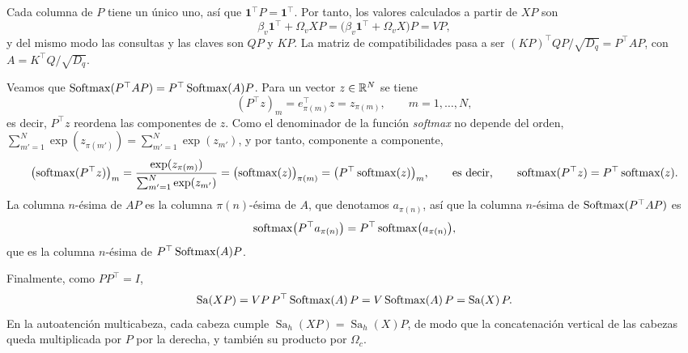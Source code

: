 \begin{demostracion}
Cada columna de $P$ tiene un único uno, así que $\mathbf{1}^{\top}P = \mathbf{1}^{\top}$.
Por tanto, los valores calculados a partir de $XP$ son
\[
  \beta_v\mathbf{1}^{\top} + \Omega_v XP = \bigl(\beta_v\mathbf{1}^{\top} + \Omega_v X\bigr)P = VP,
\]
y del mismo modo las consultas y las claves son $QP$ y $KP$. La matriz de
compatibilidades pasa a ser $(KP)^{\top}QP/\sqrt{D_q} = P^{\top}AP$, con $A = K^{\top}Q/\sqrt{D_q}$.

Veamos que $\operatorname{Softmax}(P^{\top}AP) = P^{\top}\operatorname{Softmax}(A)P$. Para un vector
$z\in\mathbb{R}^{N}$ se tiene
\[
  (P^{\top}z)_m = e_{\pi(m)}^{\top}z = z_{\pi(m)}, \qquad m = 1,\dots,N,
\]
es decir,
$P^{\top}z$ reordena las componentes de $z$. Como el denominador de la función
\emph{softmax} no depende del orden,
$\sum_{m'=1}^{N}\exp(z_{\pi(m')}) = \sum_{m'=1}^{N}\exp(z_{m'})$, y por tanto,
componente a componente,
\[
  \bigl(\operatorname{softmax}(P^{\top}z)\bigr)_m
  = \frac{\exp(z_{\pi(m)})}{\sum_{m'=1}^{N}\exp(z_{m'})}
  = \bigl(\operatorname{softmax}(z)\bigr)_{\pi(m)}
  = \bigl(P^{\top}\operatorname{softmax}(z)\bigr)_m,
  \qquad\text{es decir,}\qquad
  \operatorname{softmax}(P^{\top}z) = P^{\top}\operatorname{softmax}(z).
\]
La columna $n$-ésima de $AP$ es la columna $\pi(n)$-ésima de $A$, que denotamos
$a_{\pi(n)}$, así que la columna $n$-ésima de $\operatorname{Softmax}(P^{\top}AP)$ es
\[
  \operatorname{softmax}\bigl(P^{\top}a_{\pi(n)}\bigr) = P^{\top}\operatorname{softmax}\bigl(a_{\pi(n)}\bigr),
\]
que es la columna $n$-ésima de $P^{\top}\operatorname{Softmax}(A)P$.

Finalmente, como $PP^{\top} = I$,
\[
  \operatorname{Sa}(XP) = VP\,P^{\top}\operatorname{Softmax}(A)\,P = V\operatorname{Softmax}(A)\,P = \operatorname{Sa}(X)\,P.
\]
En la autoatención
multicabeza, cada cabeza cumple $\operatorname{Sa}_h(XP) = \operatorname{Sa}_h(X)P$,
de modo que la concatenación vertical de las cabezas queda multiplicada por $P$
por la derecha, y también su producto por $\Omega_c$.
\end{demostracion}

